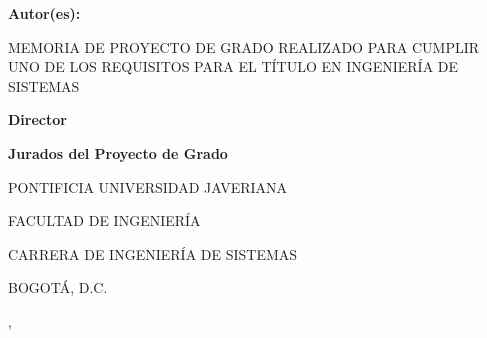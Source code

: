 \thispagestyle{fancy}

\begin{center}
    {\large\bfseries \proyectoCodigo\par}
    \vspace{0.5cm}
    {\large\bfseries \proyectoTitulo\par}
\end{center}

\vspace{2cm}

\begin{center}
    {\large\bfseries Autor(es):\par}
    \vspace{0.5cm}
    {\large \autorUno\par}
    {\large \autorDos\par}
\end{center}

\vspace{2cm}

\begin{center}
    MEMORIA DE PROYECTO DE GRADO REALIZADO PARA CUMPLIR UNO DE LOS REQUISITOS PARA EL TÍTULO EN INGENIERÍA DE SISTEMAS
\end{center}

\vspace{1.5cm}

\begin{center}
    {\large\bfseries Director\par}
    \vspace{0.5cm}
    {\large \director\par}

    \vspace{1cm}

    {\large\bfseries Jurados del Proyecto de Grado\par}
    \vspace{0.5cm}
    {\large \juradoUno\par}
    {\large \juradoDos\par}
\end{center}

\vspace{1.5cm}

\begin{center}
    {\large PONTIFICIA UNIVERSIDAD JAVERIANA\par}
    {\large FACULTAD DE INGENIERÍA\par}
    {\large CARRERA DE INGENIERÍA DE SISTEMAS\par}
    {\large BOGOTÁ, D.C.\par}
    {\large \mes, \anio\par}
\end{center}
